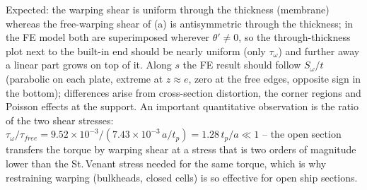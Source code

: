 \begin{enumerate}[label=\roman*.]
  Expected: the warping shear is uniform through the thickness (membrane) whereas the free-warping shear of (a) is antisymmetric through the thickness; in the FE model both are superimposed wherever $\theta'\ne0$, so the through-thickness plot next to the built-in end should be nearly uniform (only $\tau_\omega$) and further away a linear part grows on top of it. Along $s$ the FE result should follow $S_\omega/t$ (parabolic on each plate, extreme at $z\approx e$, zero at the free edges, opposite sign in the bottom); differences arise from cross-section distortion, the corner regions and Poisson effects at the support. An important quantitative observation is the ratio of the two shear stresses: $\tau_\omega/\tau_{free}=9.52\times10^{-3}/(7.43\times10^{-3}\,a/t_p)=1.28\,t_p/a\ll1$ -- the open section transfers the torque by warping shear at a stress that is two orders of magnitude lower than the St.\,Venant stress needed for the same torque, which is why restraining warping (bulkheads, closed cells) is so effective for open ship sections.
\end{enumerate}
